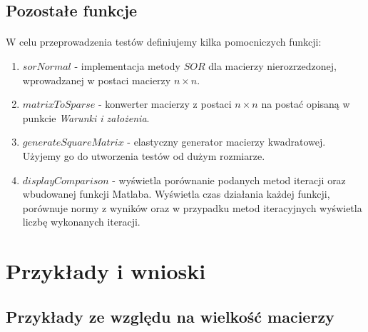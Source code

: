 \documentclass{article}
\begin{document}
\subsection{Pozostałe funkcje}
\paragraph{}
W celu przeprowadzenia testów definiujemy kilka pomocniczych funkcji:
\begin{enumerate}
\item $sorNormal$ - implementacja metody $SOR$ dla macierzy nierozrzedzonej, wprowadzanej w postaci macierzy $n\times n$.
\item $matrixToSparse$ - konwerter macierzy z postaci $n\times n$ na postać opisaną w punkcie \textit{Warunki i założenia}.
\item $generateSquareMatrix$ - elastyczny generator macierzy kwadratowej. Użyjemy go do utworzenia testów od dużym rozmiarze.
\item $displayComparison$ - wyświetla porównanie podanych metod iteracji oraz wbudowanej funkcji Matlaba. Wyświetla czas działania każdej funkcji, porównuje normy z wyników oraz w przypadku metod iteracyjnych wyświetla liczbę wykonanych iteracji.
\end{enumerate}
\section{Przykłady i wnioski}
\subsection{Przykłady ze względu na wielkość macierzy}
\end{document}

